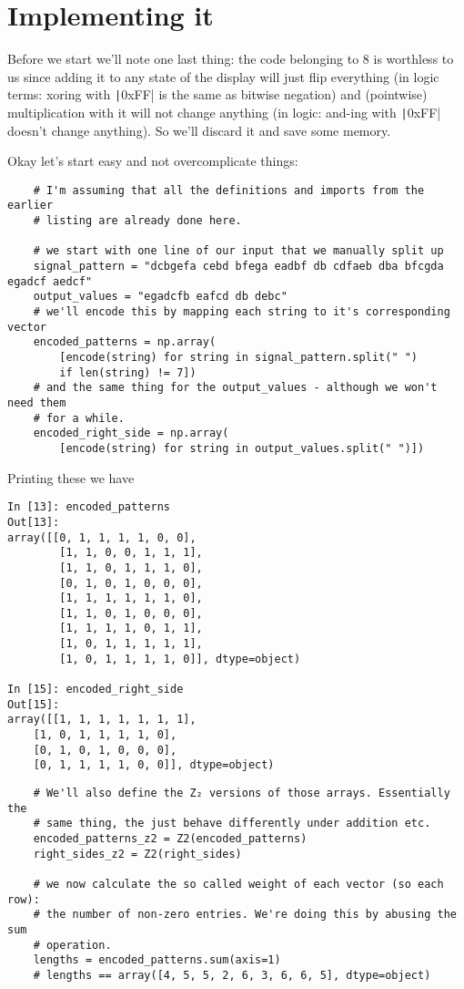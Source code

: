 \documentclass[a4paper,11pt]{article}
\begin{document}
\section{Implementing it}

Before we start we'll note one last thing: the code belonging to $8$ is worthless to us since adding it to any state of the display will just flip everything (in logic terms: xoring with \texttt|0xFF| is the same as bitwise negation) and (pointwise) multiplication with it will not change anything (in logic: and-ing with \texttt|0xFF| doesn't change anything). So we'll discard it and save some memory.

Okay let's start easy and not overcomplicate things:

\begin{verbatim}
    # I'm assuming that all the definitions and imports from the earlier
    # listing are already done here.

    # we start with one line of our input that we manually split up
    signal_pattern = "dcbgefa cebd bfega eadbf db cdfaeb dba bfcgda egadcf aedcf"
    output_values = "egadcfb eafcd db debc"
    # we'll encode this by mapping each string to it's corresponding vector
    encoded_patterns = np.array(
        [encode(string) for string in signal_pattern.split(" ")
        if len(string) != 7])
    # and the same thing for the output_values - although we won't need them
    # for a while.
    encoded_right_side = np.array(
        [encode(string) for string in output_values.split(" ")])
\end{verbatim}

Printing these we have
\begin{verbatim}
In [13]: encoded_patterns                                                       
Out[13]: 
array([[0, 1, 1, 1, 1, 0, 0],
        [1, 1, 0, 0, 1, 1, 1],
        [1, 1, 0, 1, 1, 1, 0],
        [0, 1, 0, 1, 0, 0, 0],
        [1, 1, 1, 1, 1, 1, 0],
        [1, 1, 0, 1, 0, 0, 0],
        [1, 1, 1, 1, 0, 1, 1],
        [1, 0, 1, 1, 1, 1, 1],
        [1, 0, 1, 1, 1, 1, 0]], dtype=object)

In [15]: encoded_right_side                                                     
Out[15]: 
array([[1, 1, 1, 1, 1, 1, 1],
    [1, 0, 1, 1, 1, 1, 0],
    [0, 1, 0, 1, 0, 0, 0],
    [0, 1, 1, 1, 1, 0, 0]], dtype=object)
\end{verbatim}

\begin{verbatim}
    # We'll also define the Z₂ versions of those arrays. Essentially the 
    # same thing, the just behave differently under addition etc.
    encoded_patterns_z2 = Z2(encoded_patterns)
    right_sides_z2 = Z2(right_sides)

    # we now calculate the so called weight of each vector (so each row):
    # the number of non-zero entries. We're doing this by abusing the sum
    # operation.
    lengths = encoded_patterns.sum(axis=1)
    # lengths == array([4, 5, 5, 2, 6, 3, 6, 6, 5], dtype=object)
\end{verbatim}
\end{document}
